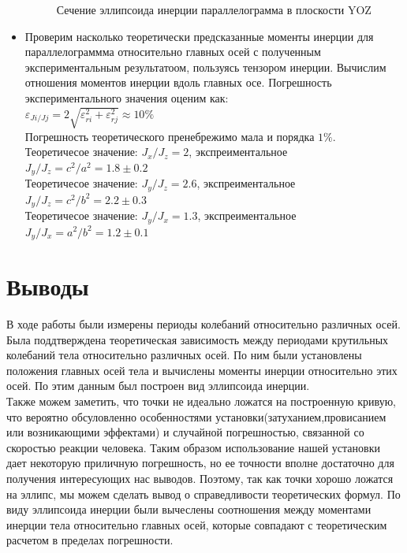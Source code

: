 \documentclass[a4paper,12pt]{article} %
\begin{document}
\begin{itemize}
\begin{figure}[!ht]
\begin{center}
\begin{minipage}[ht]{0.49\linewidth}
    \caption{Сечение эллипсоида инерции параллелограмма в плоскости YOZ}
    \end{minipage}
    \end{center}
\end{figure}


    \item Проверим насколько теоретически предсказанные моменты инерции для параллелограммма относительно
главных осей с полученным экспериментальным результатоом, пользуясь тензором инерции.
Вычислим отношения моментов инерции вдоль главных осе. Погрешность экспериментального значения оценим как:\\
$\varepsilon_{Ji/Jj}=2\sqrt{\varepsilon^2_{ri}+\varepsilon^2_{rj}} \approx 10 \%$\\
Погрешность теоретического пренебрежимо мала и порядка $1\%$.\\
Теоретичесое значение: $J_{x}/J_{z}= 2$, экспреиментальное $J_{y}/J_{z}=c^2/a^2=1.8 \pm 0.2$\\
Теоретичесое значение: $J_{y}/J_{z}= 2.6 $, экспреиментальное $J_{y}/J_{z}=c^2/b^2=2.2 \pm 0.3$\\
Теоретичесое значение: $J_{y}/J_{x}= 1.3 $, экспреиментальное $J_{y}/J_{x}=a^2/b^2=1.2 \pm 0.1$\\
\end{itemize}

\section{Выводы}

В ходе работы были измерены периоды колебаний относительно различных осей.
Была поддтверждена теоретическая зависимость между периодами крутильных колебаний тела относительно 
различных осей. По ним были установлены положения главных осей тела и вычислены моменты инерции относительно этих осей.
По этим данным был построен вид эллипсоида инерции.\\
 Также можем заметить, что точки не идеально ложатся на построенную кривую, что вероятно обсуловленно
особенностями установки(затуханием,провисанием или возникающими эффектами) и случайной погрешностью, связанной
со скоростью реакции человека. Таким образом использование нашей установки дает некоторую приличную погрешность, 
но ее точности вполне достаточно для получения интересующих нас выводов. Поэтому, так как точки хорошо ложатся на эллипс,
мы можем сделать вывод о справедливости теоретических формул.
По виду эллипсоида инерции были вычеслены соотношения между моментами инерции тела относительно главных осей,
которые совпадают с теоретическим расчетом в пределах погрешности.
\end{document}
